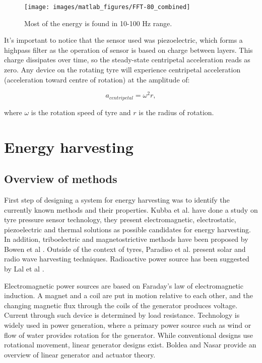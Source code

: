 \begin{figure}[htb]
\begin{center}
\texttt{[image: images/matlab\_figures/FFT-80\_combined]}
\end{center}
\caption{Most of the energy is found in 10-100 Hz range.}
\label{80_FFT_zoom}
\end{figure}

It's important to notice that the sensor used was piezoelectric, which forms a highpass filter as the operation of sensor is based on charge between layers. This charge dissipates over time, so the steady-state centripetal acceleration reads as zero. Any device on the rotating tyre will experience centripetal acceleration (acceleration toward centre of rotation) at the amplitude of: 

\begin{equation}
  a_{centripetal} = \omega^2 r,
\end{equation}

where $\omega$ is the rotation speed of tyre and $r$ is the radius of rotation.

\section{Energy harvesting}
\subsection{Overview of methods}
First step of designing a system for energy harvesting was to identify the currently known methods and their properties. Kubba et al. \cite{Kubba2014} have done a study on tyre pressure sensor technology, they present electromagnetic, electrostatic, piezoelectric and thermal solutions as possible candidates for energy harvesting. In addition, triboelectric and magnetostrictive methods have been proposed by Bowen et al \cite{Bowen2014}. Outside of the context of tyres, Paradiso et al. \cite{Paradiso2005} present solar and radio wave harvesting techniques. Radioactive power source has been suggested by Lal et al \cite{Lal2004}. 

Electromagnetic power sources are based on Faraday's law of electromagnetic induction. A magnet and a coil are put in motion relative to each other, and the changing magnetic flux through the coils of the generator produces voltage. Current through such device is determined by load resistance. Technology is widely used in power generation, where a primary power source such as wind or flow of water provides rotation for the generator. While conventional designs use rotational movement, linear generator designs exist. Boldea and Nasar \cite{Boldea1999} provide an overview of linear generator and actuator theory. 

